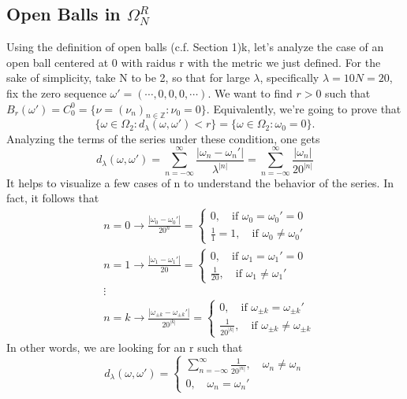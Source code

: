 \documentclass{article}
\begin{document}
\subsection{Open Balls in $\Omega_{N}^{R}$}
  Using the definition of open balls (c.f. Section 1)k, let's analyze the case of an open ball centered at 0 with raidus r
with the metric we just defined. For the sake of simplicity, take N to be 2, so that for large $\lambda$, specifically $\lambda=10N=20$, fix
the zero sequence $\omega' = (\cdots, 0, 0, 0, \cdots)$. We want to find $r > 0$ such that $B_{r}(\omega') = C_{0}^{0} = \{\nu = (\nu_{n})_{n\in\mathbb{Z}}: \nu_{0} = 0\}.$
Equivalently, we're going to prove that
  $$
  \{\omega\in  \Omega_{2}: d_{\lambda}(\omega, \omega') < r\} = \{\omega\in \Omega_{2}: \omega_{0} = 0\}.
  $$
  Analyzing the terms of the series under these condition, one gets 
  $$
  d_{\lambda}(\omega, \omega') = \sum\limits_{n=-\infty}^{\infty} \frac{|\omega_{n} - \omega_{n}'|}{\lambda^{|n|}} = \sum\limits_{n=-\infty}^{\infty} \frac{|\omega_{n}|}{20^{|n|}}
  $$
It helps to visualize a few cases of n to understand the behavior of the series. In fact, it follows that
  \begin{align*}
  &n=0 \rightarrow \frac{|\omega_{0} - \omega_{0}'|}{20^{n}} = \left\{\begin{array}{ll}
      0, \quad \text{if } \omega_{0} = \omega_{0}' = 0 \\
      \frac{1}{1} = 1, \quad \text{if } \omega_{0}\neq \omega_{0}'
    \end{array}\right.\\
  &n=1 \rightarrow \frac{|\omega_{1} - \omega_{1}'|}{20} = \left\{\begin{array}{ll}
        0, \quad \text{if } \omega_{1} = \omega_{1}' = 0 \\
        \frac{1}{20}, \quad \text{if } \omega_{1}\neq \omega_{1}'
      \end{array}\right.\\
  &  \vdots\\
  &n=k \rightarrow \frac{|\omega_{\pm k} - \omega_{\pm k}'|}{20^{|k|}} = \left\{\begin{array}{ll}
      0, \quad \text{if } \omega_{\pm k} = \omega_{\pm k}' \\
      \frac{1}{20^{|k|}}, \quad \text{if } \omega_{\pm k}\neq \omega_{\pm k}
    \end{array}\right.
  \end{align*}
  In other words, we are looking for an r such that
  $$
    d_{\lambda}(\omega, \omega') = \left\{\begin{array}{ll}
        \sum\limits_{n=-\infty}^{\infty}\frac{1}{20^{|n|}}, \quad \omega_{n}\neq \omega_{n} \\
        0, \quad \omega_{n} = \omega_{n}'
      \end{array}\right.
  $$
\end{document}
